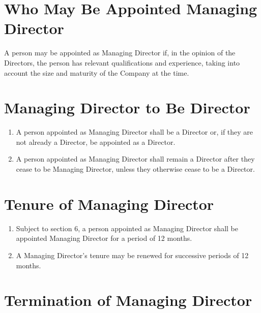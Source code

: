 \documentclass[a4paper,10pt]{article}
\begin{document}
\section{Who May Be Appointed Managing Director}

A person may be appointed as Managing Director if, in the opinion of the Directors, the person has relevant qualifications and experience, taking into account the size and maturity of the Company at the time.

\section{Managing Director to Be Director}

\begin{enumerate}
    \item A person appointed as Managing Director shall be a Director or, if they are not already a Director, be appointed as a Director.
    \item A person appointed as Managing Director shall remain a Director after they cease to be Managing Director, unless they otherwise cease to be a Director.
\end{enumerate}


\section{Tenure of Managing Director}

\begin{enumerate}
    \item Subject to section 6, a person appointed as Managing Director shall be appointed Managing Director for a period of 12 months.
    \item A Managing Director's tenure may be renewed for successive periods of 12 months.
\end{enumerate}

\section{Termination of Managing Director}
\end{document}
